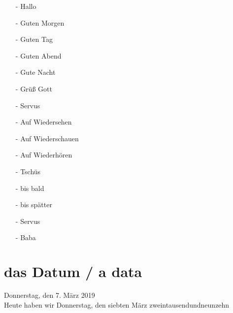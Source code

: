         \begin{multicols}{2}
            \begin{itemize}[before=\renewcommand{\baselinestretch}{1},topsep=0pt,itemsep=4pt,parsep=0pt]
                \item[-] Hallo 
                \item[-] Guten Morgen 
                \item[-] Guten Tag 
                \item[-] Guten Abend 
                \item[-] Gute Nacht 
                \item[-] Grüß Gott 
                \item[-] Servus  
            \end{itemize}
        \vfill\null
        \columnbreak
            \begin{itemize}[before=\renewcommand{\baselinestretch}{1},topsep=0pt,itemsep=4pt,parsep=0pt]
                \item[-] Auf Wiedersehen 
                \item[-] Auf Wiederschauen 
                \item[-] Auf Wiederhören 
                \item[-] Tschüs 
                \item[-] bis bald 
                \item[-] bis spätter 
                \item[-] Servus 
                \item[-] Baba   
            \end{itemize}
        \end{multicols}

    \section{das Datum / a data}\label{section:deutsch:dasdatum}

        Donnerstag, den 7. März 2019\\
        Heute haben wir Donnerstag, den siebten März zweintausendundneunzehn\\

